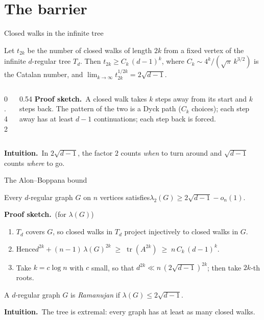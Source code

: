 \documentclass[aspectratio=169,10pt]{beamer}
\DeclareMathOperator{\tr}{tr}
\newcommand{\edge}{2\sqrt{d-1}}
\newcommand{\intuition}{{\color{accent}\textbf{Intuition.}}\ }
\newcommand{\pf}{\textbf{Proof sketch.}\ }
\begin{document}
\section{The barrier}

\begin{frame}{Closed walks in the infinite tree}
  \begin{lemma}
    Let $t_{2k}$ be the number of closed walks of length $2k$ from a fixed vertex of the infinite
    $d$-regular tree $T_d$. Then $t_{2k}\ge C_k\,(d-1)^k$, where $C_k\sim 4^k/(\sqrt{\pi}\,k^{3/2})$ is the
    Catalan number, and $\lim_{k\to\infty}t_{2k}^{1/2k}=\edge$.
  \end{lemma}
  \begin{columns}[T,onlytextwidth]
    \begin{column}{0.42\textwidth}
      \centering
      
    \end{column}
    \begin{column}{0.54\textwidth}
      \pf A closed walk takes $k$ steps \textcolor{accent}{away} from its start and $k$ steps
      \textcolor{ink}{back}. The pattern of the two is a Dyck path ($C_k$ choices); each step away
      has at least $d-1$ continuations; each step back is forced.
    \end{column}
  \end{columns}
  \vspace{2mm}
  \intuition In $\edge$, the factor $2$ counts \emph{when} to turn around and $\sqrt{d-1}$ counts \emph{where} to go.
\end{frame}

\begin{frame}{The Alon--Boppana bound}
  \begin{theorem}
    Every $d$-regular graph $G$ on $n$ vertices satisfies\quad $\lambda_2(G)\ge\edge-o_n(1)$.
  \end{theorem}
  \pf (for $\lambda(G)$)
  \begin{enumerate}
    \item $T_d$ covers $G$, so closed walks in $T_d$ project injectively to closed walks in $G$.
    \item Hence\quad $d^{2k}+(n-1)\,\lambda(G)^{2k}\;\ge\;\tr(A^{2k})\;\ge\;n\,C_k\,(d-1)^k$.
    \item Take $k=c\log n$ with $c$ small, so that $d^{2k}\ll n\,(\edge)^{2k}$; then take $2k$-th roots.
  \end{enumerate}
  \begin{definition}
    A $d$-regular graph $G$ is \emph{Ramanujan} if $\lambda(G)\le\edge$.
  \end{definition}
  \intuition The tree is extremal: every graph has at least as many closed walks.
\end{frame}
\end{document}
